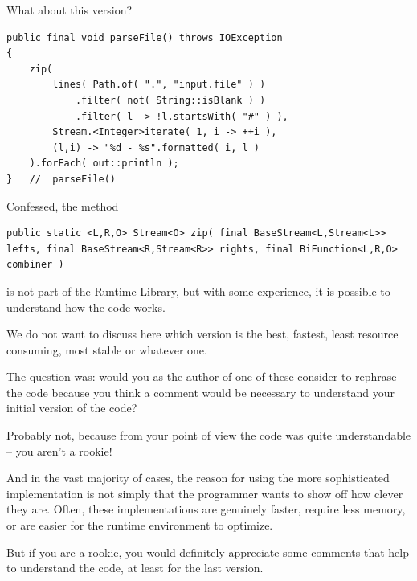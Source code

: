 What about this version?
\begin{lstlisting}
public final void parseFile() throws IOException
{
    zip( 
        lines( Path.of( ".", "input.file" ) )
            .filter( not( String::isBlank ) )
            .filter( l -> !l.startsWith( "#" ) ),
        Stream.<Integer>iterate( 1, i -> ++i ),
        (l,i) -> "%d - %s".formatted( i, l ) 
    ).forEach( out::println );
}   //  parseFile()  
\end{lstlisting}

Confessed, the method
\begin{lstlisting}[numbers=none]
public static <L,R,O> Stream<O> zip( final BaseStream<L,Stream<L>> lefts, final BaseStream<R,Stream<R>> rights, final BiFunction<L,R,O> combiner )
\end{lstlisting} 
\autocite{TQUADRAT_ORG_FOUNDATION_STREAMUTILS:zip}
is not part of the \Java Runtime Library, but with some experience, it is possible to understand how the code works.

We do not want to discuss here which version is the best, fastest, least resource consuming, most stable or whatever one.

The question was: would you as the author of one of these consider to rephrase the code because you think a comment would be necessary to understand your initial version of the code?

Probably not, because from your point of view the code was quite understandable – you aren't a rookie!

And in the vast majority of cases, the reason for using the more sophisticated implementation is not simply that the programmer wants to show off how clever they are. Often, these implementations are genuinely faster, require less memory, or are easier for the runtime environment to optimize.

But if you are a rookie, you would definitely appreciate some comments that help to understand the code, at least for the last version.


